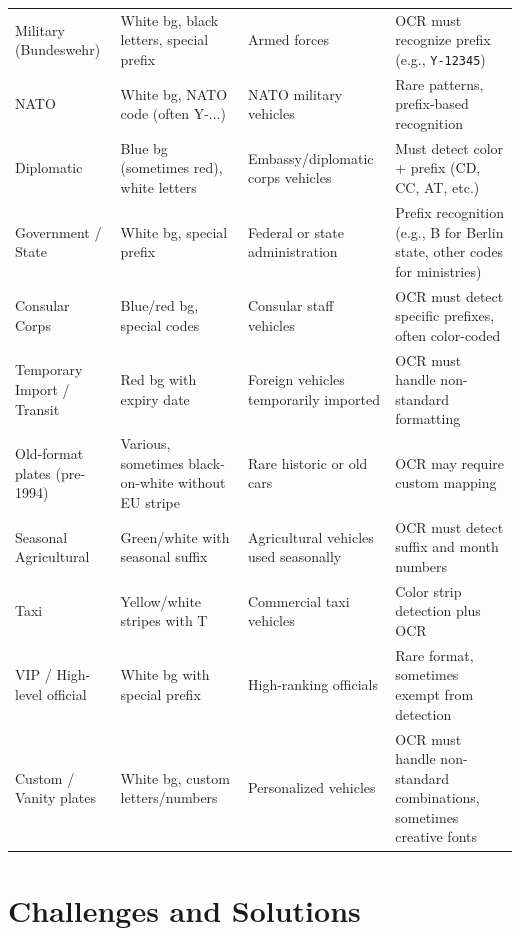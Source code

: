 \begin{longtable}{|p{3cm}|p{3cm}|p{3cm}|p{5cm}|}
			Military (Bundeswehr) & White bg, black letters, special prefix & Armed forces & OCR must recognize prefix (e.g., \texttt{Y-12345}) \\
			
			NATO & White bg, NATO code (often Y-...) & NATO military vehicles & Rare patterns, prefix-based recognition \\
			
			Diplomatic & Blue bg (sometimes red), white letters & Embassy/diplomatic corps vehicles & Must detect color + prefix (CD, CC, AT, etc.) \\
			
			Government / State & White bg, special prefix & Federal or state administration & Prefix recognition (e.g., B for Berlin state, other codes for ministries) \\
			
			Consular Corps & Blue/red bg, special codes & Consular staff vehicles & OCR must detect specific prefixes, often color-coded \\
			
			Temporary Import / Transit & Red bg with expiry date & Foreign vehicles temporarily imported & OCR must handle non-standard formatting \\
			
			Old-format plates (pre-1994) & Various, sometimes black-on-white without EU stripe & Rare historic or old cars & OCR may require custom mapping \\
			
			Seasonal Agricultural & Green/white with seasonal suffix & Agricultural vehicles used seasonally & OCR must detect suffix and month numbers \\
			
			Taxi & Yellow/white stripes with T & Commercial taxi vehicles & Color strip detection plus OCR \\
			
			VIP / High-level official & White bg with special prefix & High-ranking officials & Rare format, sometimes exempt from detection \\
			
			Custom / Vanity plates & White bg, custom letters/numbers & Personalized vehicles & OCR must handle non-standard combinations, sometimes creative fonts \\
			
			\hline
		\end{longtable}
	
	\section{Challenges and Solutions}
